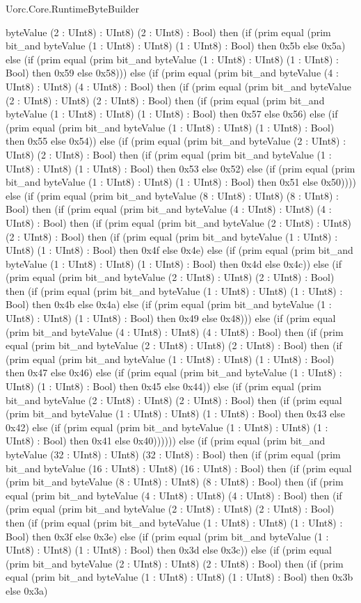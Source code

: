 \begin{lexlean}{Uorc.Core.RuntimeByteBuilder}
\begin{semanticmodule}
{byteValue (2 : UInt8) : UInt8) (2 : UInt8) : Bool) then (if (prim equal (prim bit_and byteValue (1 : UInt8) : UInt8) (1 : UInt8) : Bool) then 0x5b else 0x5a) else (if (prim equal (prim bit_and byteValue (1 : UInt8) : UInt8) (1 : UInt8) : Bool) then 0x59 else 0x58))) else (if (prim equal (prim bit_and byteValue (4 : UInt8) : UInt8) (4 : UInt8) : Bool) then (if (prim equal (prim bit_and byteValue (2 : UInt8) : UInt8) (2 : UInt8) : Bool) then (if (prim equal (prim bit_and byteValue (1 : UInt8) : UInt8) (1 : UInt8) : Bool) then 0x57 else 0x56) else (if (prim equal (prim bit_and byteValue (1 : UInt8) : UInt8) (1 : UInt8) : Bool) then 0x55 else 0x54)) else (if (prim equal (prim bit_and byteValue (2 : UInt8) : UInt8) (2 : UInt8) : Bool) then (if (prim equal (prim bit_and byteValue (1 : UInt8) : UInt8) (1 : UInt8) : Bool) then 0x53 else 0x52) else (if (prim equal (prim bit_and byteValue (1 : UInt8) : UInt8) (1 : UInt8) : Bool) then 0x51 else 0x50)))) else (if (prim equal (prim bit_and byteValue (8 : UInt8) : UInt8) (8 : UInt8) : Bool) then (if (prim equal (prim bit_and byteValue (4 : UInt8) : UInt8) (4 : UInt8) : Bool) then (if (prim equal (prim bit_and byteValue (2 : UInt8) : UInt8) (2 : UInt8) : Bool) then (if (prim equal (prim bit_and byteValue (1 : UInt8) : UInt8) (1 : UInt8) : Bool) then 0x4f else 0x4e) else (if (prim equal (prim bit_and byteValue (1 : UInt8) : UInt8) (1 : UInt8) : Bool) then 0x4d else 0x4c)) else (if (prim equal (prim bit_and byteValue (2 : UInt8) : UInt8) (2 : UInt8) : Bool) then (if (prim equal (prim bit_and byteValue (1 : UInt8) : UInt8) (1 : UInt8) : Bool) then 0x4b else 0x4a) else (if (prim equal (prim bit_and byteValue (1 : UInt8) : UInt8) (1 : UInt8) : Bool) then 0x49 else 0x48))) else (if (prim equal (prim bit_and byteValue (4 : UInt8) : UInt8) (4 : UInt8) : Bool) then (if (prim equal (prim bit_and byteValue (2 : UInt8) : UInt8) (2 : UInt8) : Bool) then (if (prim equal (prim bit_and byteValue (1 : UInt8) : UInt8) (1 : UInt8) : Bool) then 0x47 else 0x46) else (if (prim equal (prim bit_and byteValue (1 : UInt8) : UInt8) (1 : UInt8) : Bool) then 0x45 else 0x44)) else (if (prim equal (prim bit_and byteValue (2 : UInt8) : UInt8) (2 : UInt8) : Bool) then (if (prim equal (prim bit_and byteValue (1 : UInt8) : UInt8) (1 : UInt8) : Bool) then 0x43 else 0x42) else (if (prim equal (prim bit_and byteValue (1 : UInt8) : UInt8) (1 : UInt8) : Bool) then 0x41 else 0x40)))))) else (if (prim equal (prim bit_and byteValue (32 : UInt8) : UInt8) (32 : UInt8) : Bool) then (if (prim equal (prim bit_and byteValue (16 : UInt8) : UInt8) (16 : UInt8) : Bool) then (if (prim equal (prim bit_and byteValue (8 : UInt8) : UInt8) (8 : UInt8) : Bool) then (if (prim equal (prim bit_and byteValue (4 : UInt8) : UInt8) (4 : UInt8) : Bool) then (if (prim equal (prim bit_and byteValue (2 : UInt8) : UInt8) (2 : UInt8) : Bool) then (if (prim equal (prim bit_and byteValue (1 : UInt8) : UInt8) (1 : UInt8) : Bool) then 0x3f else 0x3e) else (if (prim equal (prim bit_and byteValue (1 : UInt8) : UInt8) (1 : UInt8) : Bool) then 0x3d else 0x3c)) else (if (prim equal (prim bit_and byteValue (2 : UInt8) : UInt8) (2 : UInt8) : Bool) then (if (prim equal (prim bit_and byteValue (1 : UInt8) : UInt8) (1 : UInt8) : Bool) then 0x3b else 0x3a) }
\end{semanticmodule}
\end{lexlean}
